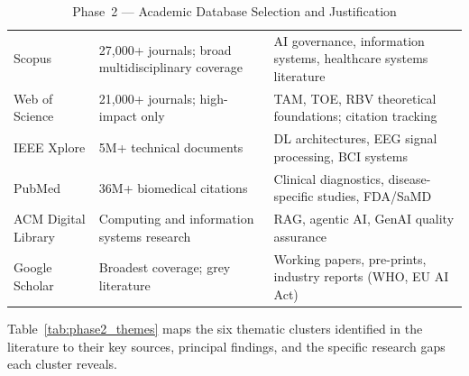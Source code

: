 \begingroup\singlespacing\tablefontsize\tablestripes
\begin{xltabular}{\textwidth}{@{} l X X @{}}
\caption{Phase~2 --- Academic Database Selection and Justification}
\label{tab:phase2_databases}\\
\toprule
{} &  &  \\
\midrule
\endfirsthead
\endhead
\bottomrule
\endlastfoot
Scopus                  & 27,000+ journals; broad multidisciplinary coverage             & AI governance, information systems, healthcare systems literature \\
\addlinespace
Web of Science          & 21,000+ journals; high-impact only                             & TAM, TOE, RBV theoretical foundations; citation tracking \\
\addlinespace
IEEE Xplore             & 5M+ technical documents                                        & DL architectures, EEG signal processing, BCI systems \\
\addlinespace
PubMed                  & 36M+ biomedical citations                                      & Clinical diagnostics, disease-specific studies, FDA/SaMD \\
\addlinespace
ACM Digital Library     & Computing and information systems research                     & RAG, agentic AI, GenAI quality assurance \\
\addlinespace
Google Scholar          & Broadest coverage; grey literature                             & Working papers, pre-prints, industry reports (WHO, EU AI Act) \\
\end{xltabular}
\endgroup

\vspace{1.5em}

Table~\ref{tab:phase2_themes} maps the six thematic clusters identified in the literature to their key sources, principal findings, and the specific research gaps each cluster reveals.

